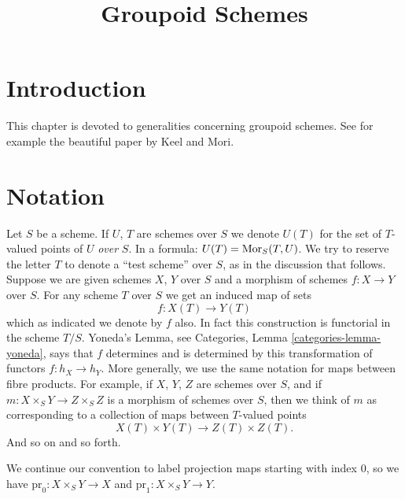 

%


\title{Groupoid Schemes}


\maketitle

\label{section-phantom}

\tableofcontents

\section{Introduction}
\label{section-introduction}

\noindent
This chapter is devoted to generalities concerning groupoid schemes.
See for example the beautiful paper \cite{K-M} by Keel and Mori.





\section{Notation}
\label{section-notation}

\noindent
Let $S$ be a scheme. If $U$, $T$ are schemes over $S$ we denote
$U(T)$ for the set of $T$-valued points of $U$ {\it over} $S$. In a formula:
$U(T) = \mathop{\mathrm{Mor}}\nolimits_S(T, U)$. We try to reserve the letter $T$ to denote
a ``test scheme'' over $S$, as in the discussion that follows.
Suppose we are given schemes $X$, $Y$ over
$S$ and a morphism of schemes $f : X \to Y$ over $S$.
For any scheme $T$ over $S$ we get an induced map of sets
$$
f : X(T) \longrightarrow Y(T)
$$
which as indicated we denote by $f$ also. In fact this construction
is functorial in the scheme $T/S$. Yoneda's Lemma, see Categories,
Lemma \ref{categories-lemma-yoneda}, says that $f$ determines and is
determined by this transformation of functors $f : h_X \to h_Y$.
More generally, we use the same notation for maps between fibre
products. For example, if
$X$, $Y$, $Z$ are schemes over $S$, and if
$m : X \times_S Y \to Z \times_S Z$ is
a morphism of schemes over $S$, then we think of $m$ as corresponding
to a collection of maps between $T$-valued points
$$
X(T) \times Y(T) \longrightarrow Z(T) \times Z(T).
$$
And so on and so forth.

\medskip\noindent
We continue our convention to label projection maps starting with
index $0$, so we have $\text{pr}_0 : X \times_S Y \to X$ and
$\text{pr}_1 : X \times_S Y \to Y$.







